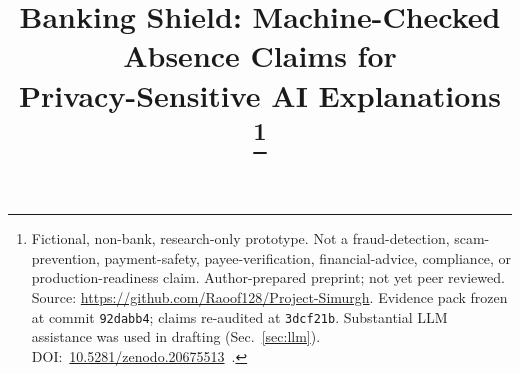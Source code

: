 \documentclass[conference]{IEEEtran}
\newcommand{\sys}{Banking Shield}
\begin{document}
\title{\sys{}: Machine-Checked Absence Claims for\\
Privacy-Sensitive AI Explanations%
\thanks{Fictional, non-bank, research-only prototype. Not a fraud-detection,
scam-prevention, payment-safety, payee-verification, financial-advice,
compliance, or production-readiness claim. Author-prepared preprint; not yet
peer reviewed. Source: \url{https://github.com/Raoof128/Project-Simurgh}.
Evidence pack frozen at commit \texttt{92dabb4}; claims re-audited at
\texttt{3dcf21b}. Substantial LLM assistance was used in drafting (Sec.~\ref{sec:llm}).
DOI:~\href{https://doi.org/10.5281/zenodo.20675513}{10.5281/zenodo.20675513}~\cite{abedini2026bankingshield}.}}

\author{
}

\maketitle
\end{document}
